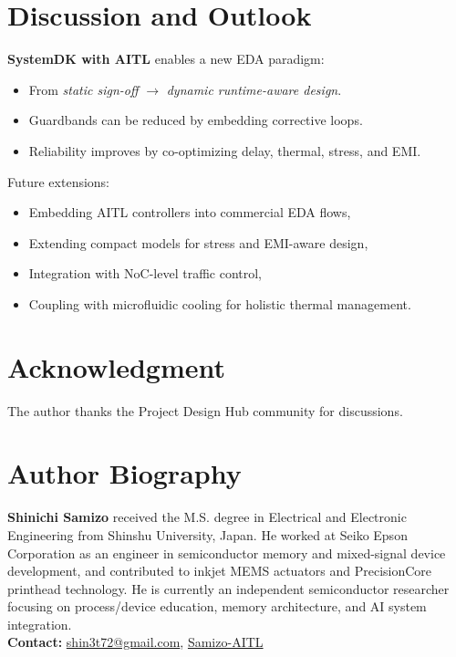 \documentclass[conference]{IEEEtran}
\begin{document}
\section{Discussion and Outlook}
\textbf{SystemDK with AITL} enables a new EDA paradigm:
\begin{itemize}
  \item From \emph{static sign-off} $\to$ \emph{dynamic runtime-aware design}.
  \item Guardbands can be reduced by embedding corrective loops.
  \item Reliability improves by co-optimizing delay, thermal, stress, and EMI.
\end{itemize}
Future extensions:
\begin{itemize}
  \item Embedding AITL controllers into commercial EDA flows,
  \item Extending compact models for stress and EMI-aware design,
  \item Integration with NoC-level traffic control,
  \item Coupling with microfluidic cooling for holistic thermal management.
\end{itemize}

\section*{Acknowledgment}
The author thanks the Project Design Hub community for discussions.




\section*{Author Biography}
\noindent\textbf{Shinichi Samizo}
received the M.S. degree in Electrical and Electronic Engineering from Shinshu University, Japan.  
He worked at Seiko Epson Corporation as an engineer in semiconductor memory and mixed-signal device development, and contributed to inkjet MEMS actuators and PrecisionCore printhead technology.  
He is currently an independent semiconductor researcher focusing on process/device education, memory architecture, and AI system integration.\\[2pt]
\textbf{Contact:} \href{mailto:shin3t72@gmail.com}{shin3t72@gmail.com}, 
\href{https://github.com/Samizo-AITL}{Samizo-AITL}
\end{document}

